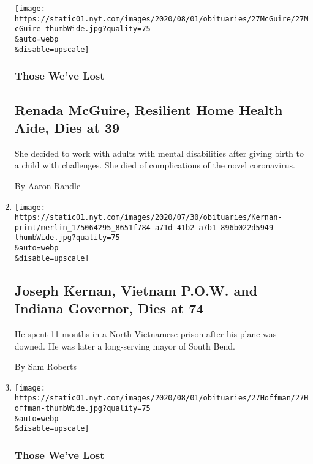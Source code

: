 \begin{enumerate}
  \texttt{[image: https://static01.nyt.com/images/2020/08/01/obituaries/27McGuire/27McGuire-thumbWide.jpg?quality=75\\\&auto=webp\\\&disable=upscale]}

  \hypertarget{those-weve-lost-1}{%
  \subsubsection{Those We've Lost}\label{those-weve-lost-1}}

  \hypertarget{renada-mcguire-resilient-home-health-aide-dies-at-39-1}{%
  \subsection{Renada McGuire, Resilient Home Health Aide, Dies at
  39}\label{renada-mcguire-resilient-home-health-aide-dies-at-39-1}}

  She decided to work with adults with mental disabilities after giving
  birth to a child with challenges. She died of complications of the
  novel coronavirus.

  By Aaron Randle
\item
  \href{/2020/07/29/us/politics/joseph-kernan-dead.html}{}

  \texttt{[image: https://static01.nyt.com/images/2020/07/30/obituaries/Kernan-print/merlin\_175064295\_8651f784-a71d-41b2-a7b1-896b022d5949-thumbWide.jpg?quality=75\\\&auto=webp\\\&disable=upscale]}

  \hypertarget{joseph-kernan-vietnam-pow-and-indiana-governor-dies-at-74}{%
  \subsection{Joseph Kernan, Vietnam P.O.W. and Indiana Governor, Dies
  at
  74}\label{joseph-kernan-vietnam-pow-and-indiana-governor-dies-at-74}}

  He spent 11 months in a North Vietnamese prison after his plane was
  downed. He was later a long-serving mayor of South Bend.

  By Sam Roberts
\item
  \href{/2020/07/29/obituaries/katherine-hoffman-dead-coronavirus.html}{}

  \texttt{[image: https://static01.nyt.com/images/2020/08/01/obituaries/27Hoffman/27Hoffman-thumbWide.jpg?quality=75\\\&auto=webp\\\&disable=upscale]}

  \hypertarget{those-weve-lost-2}{%
  \subsubsection{Those We've Lost}\label{those-weve-lost-2}}


\end{enumerate}
